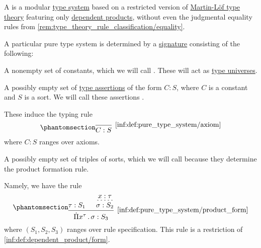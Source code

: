 \begin{definition}\label{def:pure_type_system}
  A  is a modular \hyperref[def:abstract_type_system]{type system} based on a restricted version of \hyperref[def:mltt]{Martin-L\"of type theory} featuring only \hyperref[def:dependent_product]{dependent products}, without even the judgmental equality rules from \cref{rem:type_theory_rule_classification/equality}.

  A particular pure type system is determined by a \hyperref[con:logical_system_signature]{signature} consisting of the following:
  \begin{thmenum}
     A nonempty set of constants, which we will call . These will act as \hyperref[con:type_universe]{type universes}.

     A possibly empty set of \hyperref[def:type_assertion]{type assertions} of the form \( C: S \), where \( C \) is a constant and \( S \) is a sort. We will call these assertions .

    These induce the typing rule
    \begin{equation*}\taglabel[\logic{Ax}]{inf:def:pure_type_system/axiom}
      \begin{prooftree}
        \infer0[\ref{inf:def:pure_type_system/axiom}]{ C: S },
      \end{prooftree}
    \end{equation*}
    where \( C: S \) ranges over axioms.

     A possibly empty set of triples of sorts, which we will call  because they determine the product formation rule.

    Namely, we have the rule
    \begin{equation*}\taglabel[\ensuremath{ \Pi_{\logic{form}}^{\logic{PTS}} }]{inf:def:pure_type_system/product_form}
      \begin{prooftree}
        \hypo{ \tau: S_1 }

        \hypo{ x: \tau }
        \infer[dashed]1{ \sigma: S_2 }

        \infer2[\ref{inf:def:pure_type_system/product_form}]{ \qprod {x^\tau} \sigma: S_3 }
      \end{prooftree}
    \end{equation*}
    where \( (S_1, S_2, S_3) \) ranges over rule specification. This rule is a restriction of \ref{inf:def:dependent_product/form}.


\end{thmenum}
\end{definition}
